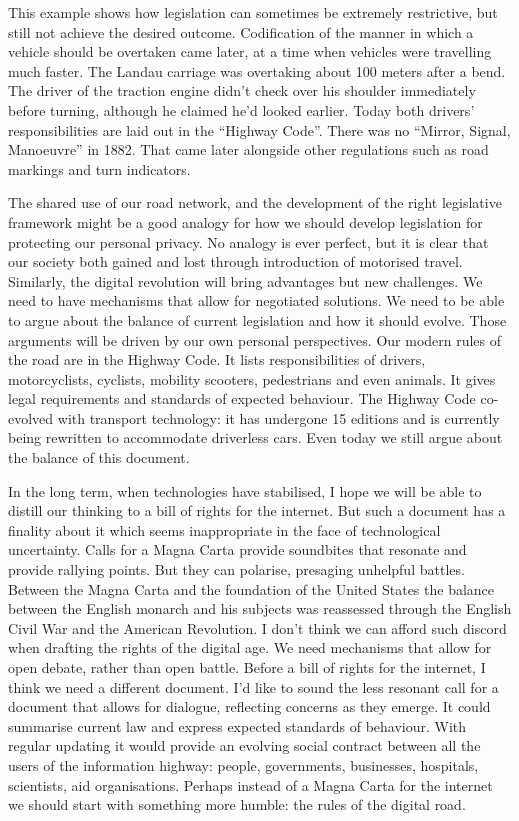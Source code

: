 \documentclass[a4paper]{caesar_book}
\begin{document}
This example shows how legislation can sometimes be extremely restrictive, but still not achieve the desired outcome. Codification of the manner in which a vehicle should be overtaken came later, at a time when vehicles were travelling much faster. The Landau carriage was overtaking about 100 meters after a bend. The driver of the traction engine didn't check over his shoulder immediately before turning, although he claimed he’d looked earlier. Today both drivers’ responsibilities are laid out in the “Highway Code”. There was no “Mirror, Signal, Manoeuvre” in 1882. That came later alongside other regulations such as road markings and turn indicators.

The shared use of our road network, and the development of the right legislative framework might be a good analogy for how we should develop legislation for protecting our personal privacy. No analogy is ever perfect, but it is clear that our society both gained and lost through introduction of motorised travel. Similarly, the digital revolution will bring advantages but new challenges. We need to have mechanisms that allow for negotiated solutions. We need to be able to argue about the balance of current legislation and how it should evolve. Those arguments will be driven by our own personal perspectives. Our modern rules of the road are in the Highway Code. It lists responsibilities of drivers, motorcyclists, cyclists, mobility scooters, pedestrians and even animals. It gives legal requirements and standards of expected behaviour. The Highway Code co-evolved with transport technology: it has undergone 15 editions and is currently being rewritten to accommodate driverless cars. Even today we still argue about the balance of this document.

In the long term, when technologies have stabilised, I hope we will be able to distill our thinking to a bill of rights for the internet. But such a document has a finality about it which seems inappropriate in the face of technological uncertainty. Calls for a Magna Carta provide soundbites that resonate and provide rallying points. But they can polarise, presaging unhelpful battles. Between the Magna Carta and the foundation of the United States the balance between the English monarch and his subjects was reassessed through the English Civil War and the American Revolution. I don’t think we can afford such discord when drafting the rights of the digital age. We need mechanisms that allow for open debate, rather than open battle. Before a bill of rights for the internet, I think we need a different document. I’d like to sound the less resonant call for a document that allows for dialogue, reflecting concerns as they emerge. It could summarise current law and express expected standards of behaviour. With regular updating it would provide an evolving social contract between all the users of the information highway: people, governments, businesses, hospitals, scientists, aid organisations. Perhaps instead of a Magna Carta for the internet we should start with something more humble: the rules of the digital road.
\end{document}
